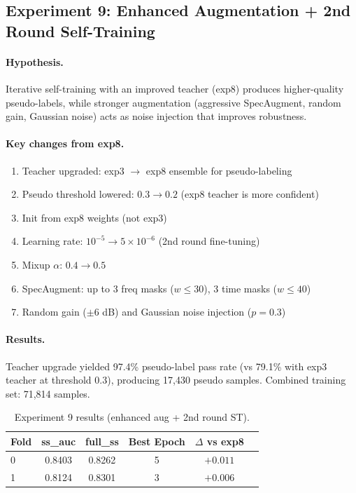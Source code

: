 \subsection{Experiment 9: Enhanced Augmentation + 2nd Round Self-Training}
\label{sec:exp9}

\paragraph{Hypothesis.}
Iterative self-training with an improved teacher (exp8) produces higher-quality
pseudo-labels, while stronger augmentation (aggressive SpecAugment, random gain,
Gaussian noise) acts as noise injection that improves robustness.

\paragraph{Key changes from exp8.}
\begin{enumerate}
    \item Teacher upgraded: exp3 $\to$ exp8 ensemble for pseudo-labeling
    \item Pseudo threshold lowered: $0.3 \to 0.2$ (exp8 teacher is more confident)
    \item Init from exp8 weights (not exp3)
    \item Learning rate: $10^{-5} \to 5 \times 10^{-6}$ (2nd round fine-tuning)
    \item Mixup $\alpha$: $0.4 \to 0.5$
    \item SpecAugment: up to 3 freq masks ($w \leq 30$), 3 time masks ($w \leq 40$)
    \item Random gain ($\pm 6$ dB) and Gaussian noise injection ($p=0.3$)
\end{enumerate}

\paragraph{Results.}
Teacher upgrade yielded 97.4\% pseudo-label pass rate (vs 79.1\% with exp3
teacher at threshold 0.3), producing 17,430 pseudo samples.
Combined training set: 71,814 samples.

\begin{table}[h]
\centering
\caption{Experiment 9 results (enhanced aug + 2nd round ST).}
\label{tab:exp9}
\begin{tabular}{lccccc}
\hline
\textbf{Fold} & \textbf{ss\_auc} & \textbf{full\_ss} & \textbf{Best Epoch} & \textbf{$\Delta$ vs exp8} \\
\hline
0 & 0.8403 & 0.8262 & 5 & $+0.011$ \\
1 & 0.8124 & 0.8301 & 3 & $+0.006$ \\
\hline
\end{tabular}
\end{table}

